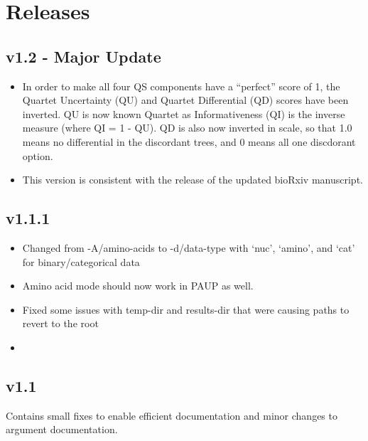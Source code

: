 \documentclass[letterpaper,12pt,english]{sphinxmanual}
\begin{document}
\chapter{Releases}
\label{\detokenize{releases:id1}}\label{\detokenize{releases::doc}}\label{\detokenize{releases:releases}}

\section{v1.2 - Major Update}
\label{\detokenize{releases:v1-2-major-update}}\begin{itemize}
\item {} 
In order to make all four QS components have a “perfect” score of 1, the Quartet Uncertainty (QU) and Quartet Differential (QD) scores have been inverted. QU is now known Quartet as Informativeness (QI) is the inverse measure (where QI = 1 - QU).  QD is also now inverted in scale, so that 1.0 means no differential in the discordant trees, and 0 means all one discdorant option.

\item {} 
This version is consistent with the release of the updated bioRxiv manuscript.

\end{itemize}


\section{v1.1.1}
\label{\detokenize{releases:v1-1-1}}\begin{itemize}
\item {} 
Changed from -A/\textendash{}amino-acids to -d/\textendash{}data-type with ‘nuc’, ‘amino’, and ‘cat’ for binary/categorical data

\item {} 
Amino acid mode should now work in PAUP as well.

\item {} 
Fixed some issues with temp-dir and results-dir that were causing paths to revert to the root

\item {} 

\end{itemize}


\section{v1.1}
\label{\detokenize{releases:v1-1}}
Contains small fixes to enable efficient documentation and minor changes to argument documentation.
\end{document}
